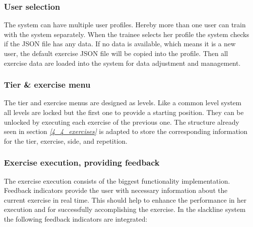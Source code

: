 
\subsubsection{User selection}
The system can have multiple user profiles. Hereby more than one user can train with the system separately. When the trainee selects her profile the system checks if the JSON file has any data. If no data is available, which means it is a new user, the default exercise JSON file will be copied into the profile. Then all exercise data are loaded into the system for data adjustment and management.

\subsubsection{Tier \& exercise menu}
The tier and exercise menus are designed as levels. Like a common level system all levels are locked but the first one to provide a starting position. They can be unlocked by executing each exercise of the previous one. The structure already seen in section \textit{\ref{4_4_exercises}} is adapted to store the corresponding information for the tier, exercise, side, and repetition.

\subsubsection{Exercise execution, providing feedback}
The exercise execution consists of the biggest functionality implementation. Feedback indicators provide the user with necessary information about the current exercise in real time. This should help to enhance the performance in her execution and for successfully accomplishing the exercise. In the slackline system the following feedback indicators are integrated:

